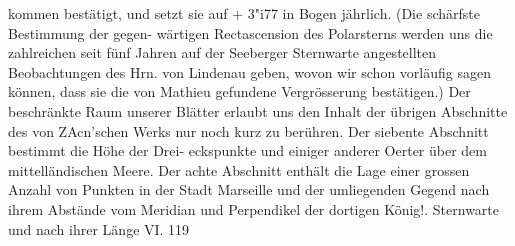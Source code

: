 \documentclass[12pt,a4paper]{article}
\begin{document}
kommen bestätigt, und setzt sie auf + 3"i77 in Bogen jährlich. (Die schärfste Bestimmung der gegen-\newline
wärtigen Rectascension des Polarsterns werden uns die zahlreichen seit fünf Jahren auf der Seeberger\newline
Sternwarte angestellten Beobachtungen des Hrn. von Lindenau geben, wovon wir schon vorläufig sagen\newline
können, dass sie die von Mathieu gefundene Vergrösserung bestätigen.)\newline
Der beschränkte Raum unserer Blätter erlaubt uns den Inhalt der übrigen Abschnitte des von\newline
ZAcn'schen Werks nur noch kurz zu berühren. Der siebente Abschnitt bestimmt die Höhe der Drei-\newline
eckspunkte und einiger anderer Oerter über dem mittelländischen Meere. Der achte Abschnitt enthält\newline
die Lage einer grossen Anzahl von Punkten in der Stadt Marseille und der umliegenden Gegend nach\newline
ihrem Abstände vom Meridian und Perpendikel der dortigen König!. Sternwarte und nach ihrer Länge\newline
VI. 119\newline
\end{document}
